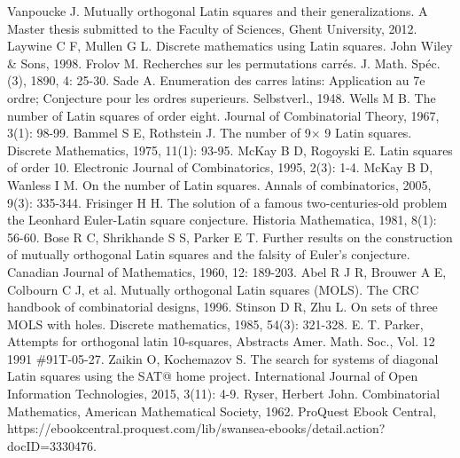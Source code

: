 \documentclass[12pt]{article}
\begin{document}
\begin{thebibliography}{99}  

Vanpoucke J. Mutually orthogonal Latin squares and their generalizations. A Master thesis submitted to the Faculty of Sciences, Ghent University, 2012.
Laywine C F, Mullen G L. Discrete mathematics using Latin squares. John Wiley \& Sons, 1998.
Frolov M. Recherches sur les permutations carrés. J. Math. Spéc.(3), 1890, 4: 25-30.
Sade A. Enumeration des carres latins: Application au 7e ordre; Conjecture pour les ordres superieurs. Selbstverl., 1948.
Wells M B. The number of Latin squares of order eight. Journal of Combinatorial Theory, 1967, 3(1): 98-99.
Bammel S E, Rothstein J. The number of 9× 9 Latin squares. Discrete Mathematics, 1975, 11(1): 93-95.
McKay B D, Rogoyski E. Latin squares of order 10. Electronic Journal of Combinatorics, 1995, 2(3): 1-4.
McKay B D, Wanless I M. On the number of Latin squares. Annals of combinatorics, 2005, 9(3): 335-344.
Frisinger H H. The solution of a famous two-centuries-old problem the Leonhard Euler-Latin square conjecture. Historia Mathematica, 1981, 8(1): 56-60.
Bose R C, Shrikhande S S, Parker E T. Further results on the construction of mutually orthogonal Latin squares and the falsity of Euler's conjecture. Canadian Journal of Mathematics, 1960, 12: 189-203.
Abel R J R, Brouwer A E, Colbourn C J, et al. Mutually orthogonal Latin squares (MOLS). The CRC handbook of combinatorial designs, 1996.
Stinson D R, Zhu L. On sets of three MOLS with holes. Discrete mathematics, 1985, 54(3): 321-328.
E. T. Parker, Attempts for orthogonal latin 10-squares, Abstracts Amer. Math. Soc., Vol. 12 1991 \#91T-05-27.
Zaikin O, Kochemazov S. The search for systems of diagonal Latin squares using the SAT@ home project. International Journal of Open Information Technologies, 2015, 3(11): 4-9.
Ryser, Herbert John. Combinatorial Mathematics, American Mathematical Society, 1962. ProQuest Ebook Central, https://ebookcentral.proquest.com/lib/swansea-ebooks/detail.action?docID=3330476.

\end{thebibliography}
\end{document}

